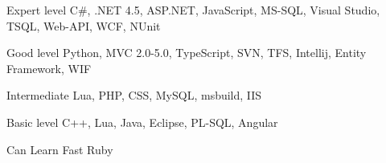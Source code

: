 \documentclass{tccv}
\begin{document}
\begin{factlist}

\item{Expert level}
     {C\#, .NET 4.5, ASP.NET, JavaScript, MS-SQL, Visual Studio, TSQL, Web-API, WCF, NUnit}

\item{Good level}
     {Python, MVC 2.0-5.0, TypeScript, SVN, TFS, Intellij, Entity Framework, WIF}

\item{Intermediate}
     {Lua, PHP, CSS, MySQL, msbuild, IIS}

\item{Basic level}
     {C++, Lua, Java, Eclipse, PL-SQL, Angular}

\item{Can Learn Fast}
     {Ruby}

\end{factlist}
\end{document}
